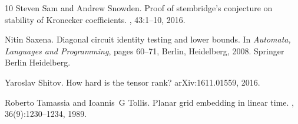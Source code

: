 \documentclass[10pt,a4paper]{article}
\numberwithin{equation}{section}
\theoremstyle{definition}
\begin{document}
\begin{thebibliography}{10}
Steven Sam and Andrew Snowden.
\newblock Proof of stembridge's conjecture on stability of {K}ronecker
  coefficients.
, 43:1--10, 2016.

Nitin Saxena.
\newblock Diagonal circuit identity testing and lower bounds.
\newblock In {\em Automata, Languages and Programming}, pages 60--71, Berlin,
  Heidelberg, 2008. Springer Berlin Heidelberg.

Yaroslav Shitov.
\newblock How hard is the tensor rank?
\newblock arXiv:1611.01559, 2016.

Roberto Tamassia and Ioannis~G Tollis.
\newblock Planar grid embedding in linear time.
, 36(9):1230--1234,
  1989.

\end{thebibliography}
\end{document}
